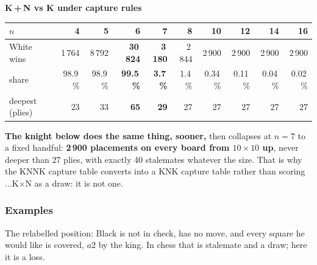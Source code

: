 \documentclass[10pt]{article}
\begin{document}
\begin{center}\small
\textbf{K\,+\,N vs K under capture rules}\\[1mm]
\begin{tabular}{@{}lrrrrrrrrr@{}}
\toprule
$n$ & 4 & 5 & \textbf{6} & \textbf{7} & 8 & 10 & 12 & 14 & 16 \\
\midrule
White wins & 1\,764 & 8\,792 & \textbf{30\,824} &
  \textbf{3\,180} & 2\,844 & 2\,900 & 2\,900 & 2\,900 & 2\,900 \\
share & 98.9\,\% & 98.9\,\% & \textbf{99.5\,\%} & \textbf{3.7\,\%} &
  1.4\,\% & 0.34\,\% & 0.11\,\% & 0.04\,\% & 0.02\,\% \\
deepest (plies) & 23 & 33 & \textbf{65} & \textbf{29} & 27 & 27 & 27 & 27 & 27 \\
\bottomrule
\end{tabular}
\end{center}

\noindent
\textbf{The knight below does the same thing, sooner,} then collapses at $n=7$
to a fixed handful: \textbf{2\,900 placements on every board from $10\times10$
up}, never deeper than 27 plies, with exactly 40 stalemates whatever the size.
That is why the KNNK capture table converts into a KNK capture table rather
than scoring $\ldots$K$\times$N as a draw: it is not one.

\subsubsection{Examples}\label{sub:kn-longest}

\medskip
\noindent
\begin{minipage}[t]{0.30\textwidth}
\end{minipage}\hfill
\begin{minipage}[t]{0.66\textwidth}\vspace{0pt}\small
The relabelled position: Black is not in check, has no move, and every square
he would like is covered, $a2$ by the king. In chess that is stalemate and a
draw; here it is a loss.
\end{minipage}
\end{document}
